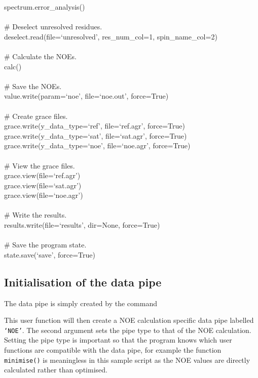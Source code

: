 \begin{exampleenv}
spectrum.error\_analysis() \\
 \\
\# Deselect unresolved residues. \\
deselect.read(file=`unresolved', res\_num\_col=1, spin\_name\_col=2) \\
 \\
\# Calculate the NOEs. \\
calc() \\
 \\
\# Save the NOEs. \\
value.write(param=`noe', file=`noe.out', force=True) \\
 \\
\# Create grace files. \\
grace.write(y\_data\_type=`ref', file=`ref.agr', force=True) \\
grace.write(y\_data\_type=`sat', file=`sat.agr', force=True) \\
grace.write(y\_data\_type=`noe', file=`noe.agr', force=True) \\
 \\
\# View the grace files. \\
grace.view(file=`ref.agr') \\
grace.view(file=`sat.agr') \\
grace.view(file=`noe.agr') \\
 \\
\# Write the results. \\
results.write(file=`results', dir=None, force=True) \\
 \\
\# Save the program state. \\
state.save(`save', force=True)
\end{exampleenv}




\subsection{Initialisation of the data pipe} \label{NOE initialisation}

The data pipe is simply created by the command


This user function will then create a NOE calculation specific data pipe labelled \texttt{`NOE'}.  The second argument sets the pipe type to that of the NOE calculation.  Setting the pipe type is important so that the program knows which user functions are compatible with the data pipe, for example the function \texttt{minimise()} is meaningless in this sample script as the NOE values are directly calculated rather than optimised.


